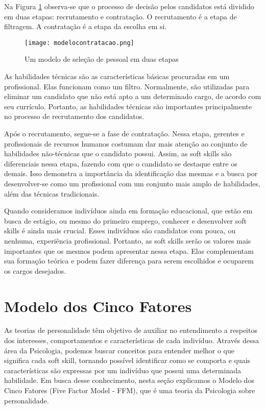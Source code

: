 Na Figura \ref{fig:modelocontratacao} observa-se que o processo de decisão pelos candidatos está dividido em duas etapas: recrutamento e contratação. O recrutamento é a etapa de filtragem. A contratação é a etapa da escolha em si.

\begin{figure}[ht]
\centering
\caption{\small Um modelo de seleção de pessoal em duas etapas}
\texttt{[image: modelocontratacao.png]}
\label{fig:modelocontratacao}
\end{figure}

As habilidades técnicas são as características básicas procuradas em um profissional. Elas funcionam como um filtro. Normalmente, são utilizadas para eliminar um candidato que não está apto a um determinado cargo, de acordo com seu currículo. Portanto, as habilidades técnicas são importantes principalmente no processo de recrutamento dos candidatos.

Após o recrutamento, segue-se a fase de contratação. Nessa etapa, gerentes e profissionais de recursos humanos costumam dar mais atenção ao conjunto de habilidades não-técnicas que o candidato possui. Assim, as soft skills são diferenciais nessa etapa, fazendo com que o candidato se destaque entre os demais. Isso demonstra a importância da identificação das mesmas e a busca por desenvolver-se como um profissional com um conjunto mais amplo de habilidades, além das técnicas tradicionais.

Quando consideramos indivíduos ainda em formação educacional, que estão em busca de estágio, ou mesmo do primeiro emprego, conhecer e desenvolver soft skills é ainda mais crucial. Esses indivíduos são candidatos com pouca, ou nenhuma, experiência profissional. Portanto, as soft skills serão os valores mais importantes que os mesmos podem apresentar nessa etapa. Elas complementam sua formação teórica e podem fazer diferença para serem escolhidos e ocuparem os cargos desejados.

\section{Modelo dos Cinco Fatores}
\label{sec:ffm}

As teorias de personalidade têm objetivo de auxiliar no entendimento a respeitos dos interesses, comportamentos e características de cada indivíduo. Através dessa área da Psicologia, podemos buscar conceitos para entender melhor o que significa cada soft skill, tornando possível identificar como se comporta e quais características são expressas por um indivíduo que possui uma determinada habilidade. Em busca desse conhecimento, nesta seção explicamos o Modelo dos Cinco Fatores (Five Factor Model - FFM), que é uma teoria da Psicologia sobre personalidade.


